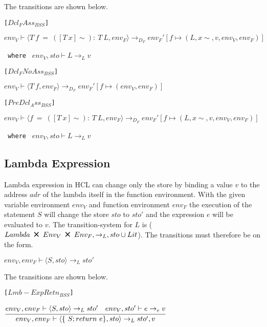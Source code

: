 The transitions are shown below.

\texttt{[$Dcl_FAss_{BSS}$]}\\
\begin{center}
	\begin{math}
			{env_V \vdash \langle T\ f\ =\ ([T\ x]\sim):\ T\ L,env_F \rangle \rightarrow_{D_F} env_F'[f \mapsto (L, x\sim, v, env_V, env_F)]}
	\end{math}
	
	\texttt{ where } $env_V, sto \vdash L \rightarrow_L v$
\end{center}

\texttt{[$Dcl_FNoAss_{BSS}$]}\\
\begin{center}
	\begin{math}
	{env_V \vdash \langle T\ f,env_F \rangle \rightarrow_{D_F} env_F'[f \mapsto (env_V, env_F)]}
	\end{math}
\end{center}

\texttt{[$PreDcl_Ass_{BSS}$]}\\
\begin{center}
	\begin{math}
	{env_V \vdash \langle f\ =\ ([T\ x]\sim):\ T\ L,env_F \rangle \rightarrow_{D_F} env_F'[f \mapsto (L, x\sim, v, env_V, env_F)]}
	\end{math}
	
	\texttt{ where } $env_V, sto \vdash L \rightarrow_L v$
\end{center}

\subsection{Lambda Expression}
Lambda expression in HCL can change only the store by binding a value $v$ to the address $adr$ of the lambda itself in the function environment.
With the given variable environment $env_V$ and function environment $env_F$ the execution of the statement $S$ will change the store $sto$ to $sto'$ and the expression $e$ will be evaluated to $v$.
The transition-system for $L$ is ($Lambda\ \Cross\ Env_V\ \Cross\ Env_F, \rightarrow_L, sto \cup Lit$).
The transitions must therefore be on the form.
\begin{center}
	$env_V, env_F \vdash \langle S, sto \rangle \rightarrow_L sto'$
\end{center}

The transitions are shown below.

\texttt{[$Lmb-ExpRetn_{BSS}$]}
\begin{center}
	\begin{math}
		\cfrac
			{env_V, env_F \vdash \langle S, sto \rangle \rightarrow_L sto' \quad env_V, sto' \vdash e \rightarrow_e v}
			{env_V, env_F \vdash \langle \{\ S;return\ e \}, sto \rangle \rightarrow_L sto', v}
	\end{math}
\end{center}

